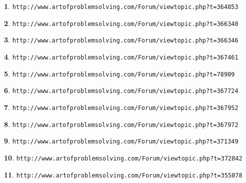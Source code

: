\documentclass{article}
\theoremstyle{definition}
\newtheorem{s}{}
\begin{document}
\begin{s}
\texttt{http://www.artofproblemsolving.com/Forum/viewtopic.php?t=364853}
\end{s}


\begin{s}
\texttt{http://www.artofproblemsolving.com/Forum/viewtopic.php?t=366340}
\end{s}



\begin{s}
\texttt{http://www.artofproblemsolving.com/Forum/viewtopic.php?t=366346}
\end{s}


\begin{s}
\texttt{http://www.artofproblemsolving.com/Forum/viewtopic.php?t=367461}
\end{s}





\begin{s}
\texttt{http://www.artofproblemsolving.com/Forum/viewtopic.php?t=78909}
\end{s}


\begin{s}
\texttt{http://www.artofproblemsolving.com/Forum/viewtopic.php?t=367724}
\end{s}



\begin{s}
\texttt{http://www.artofproblemsolving.com/Forum/viewtopic.php?t=367952}
\end{s}


\begin{s}
\texttt{http://www.artofproblemsolving.com/Forum/viewtopic.php?t=367972}
\end{s}





\begin{s}
\texttt{http://www.artofproblemsolving.com/Forum/viewtopic.php?t=371349}
\end{s}


\begin{s}
\texttt{http://www.artofproblemsolving.com/Forum/viewtopic.php?t=372842}
\end{s}



\begin{s}
\texttt{http://www.artofproblemsolving.com/Forum/viewtopic.php?t=355078}
\end{s}
\end{document}
